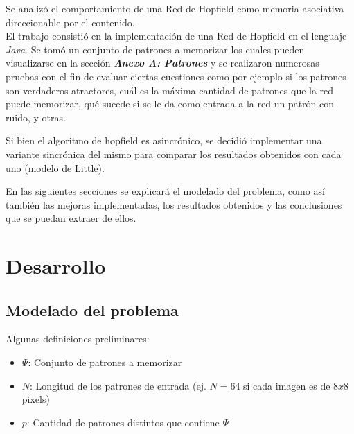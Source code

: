 \documentclass[%
    final,
    reprint,
    notitlepage,
    narroweqnarray,
    inline,
    twoside,
    invited
    ]{ieee}
\begin{document}
\par Se analizó el comportamiento de una Red de Hopfield como memoria asociativa direccionable por el contenido.\\
El trabajo consistió en la implementación de una Red de Hopfield en el lenguaje \textit{Java}. Se tomó un conjunto de patrones a memorizar los cuales pueden visualizarse en la sección \textbf{\textit{Anexo A: Patrones}} y se realizaron numerosas pruebas con el fin 
de evaluar ciertas cuestiones como por ejemplo si los patrones son verdaderos atractores, cuál es la máxima cantidad de patrones que la red puede memorizar, qué sucede si se le da como entrada a la red un patrón con ruido, y otras.\\
\par Si bien el algoritmo de hopfield es asincrónico, se decidió implementar una variante sincrónica del mismo para comparar los resultados obtenidos con cada uno (modelo de Little).\\
\par En las siguientes secciones se explicará el modelado del problema, como así también las mejoras implementadas, los resultados obtenidos y las conclusiones que se puedan extraer de ellos.



\section{Desarrollo}

\subsection{Modelado del problema}

\par Algunas definiciones preliminares:\\
\begin{itemize}
\item \textbf{$\Psi$}: Conjunto de patrones a memorizar
\item \textbf{$N$}: Longitud de los patrones de entrada (ej. $N = 64$ si cada imagen es de $8x8$ pixels)
\item \textbf{$p$}: Cantidad de patrones distintos que contiene $\Psi$\\
\end{itemize}
\end{document}
